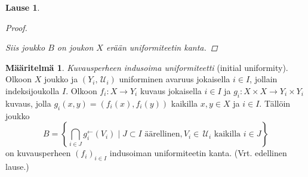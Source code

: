 \documentclass[12pt,a4paper,leqno]{report}
\newcommand{\N}{\mathbb{N}}
\newcommand{\U}{\,\mathcal{U}}
\theoremstyle{plain}
\newtheorem{lause}[equation]{Lause}
\theoremstyle{definition}
\newtheorem{maar}[equation]{Määritelmä}
\theoremstyle{remark}
\begin{document}
\begin{lause}
\begin{proof}
\begin{enumerate}
%
%
%
%
%
%
\end{enumerate}
Siis joukko $B$ on joukon $X$ erään uniformiteetin kanta.
%
\end{proof}
\end{lause}
\begin{maar}\label{kuvausperheen indusoima}
\emph{Kuvausperheen indusoima uniformiteetti} (initial uniformity). \\
%
%
Olkoon $X$ joukko ja $(Y_i,\U_i)$ uniforminen avaruus jokaisella $i\in I$, jollain indeksijoukolla $I$. 
Olkoon $f_i\colon X\rightarrow Y_i$ kuvaus jokaisella $i\in I$ ja  
$g_i\colon X\times X\rightarrow Y_i\times Y_i$ kuvaus, jolla $g_i(x,y)=(f_i(x), f_i(y))$ kaikilla $x,y\in X$ ja 
$i\in I$.
Tällöin joukko 
$$B=\left\{\bigcap_{i\in J}g^{\leftarrow}_{i}(V_{i})
\mid J\subset I\text{ äärellinen},V_{i} \in\U_{i}\text{ kaikilla } i\in J\right\}$$
on kuvausperheen $(f_i)_{i\in I}$ indusoiman uniformiteetin kanta. 
(Vrt. edellinen lause.)



\end{maar}
\end{document}
